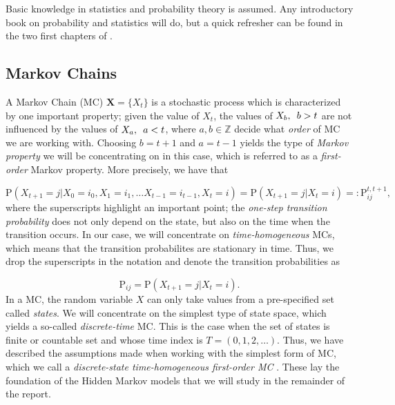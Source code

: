 \documentclass{article}\usepackage[]{graphicx}\usepackage[]{color}
\begin{document}
Basic knowledge in statistics and probability theory is assumed. Any introductory book on probability and statistics will do, but a quick refresher can be found in the two first chapters of \cite{Pinsky2011}.

\subsection{Markov Chains}
A Markov Chain (MC) $\mathbf{X} = \{X_t\}$ is a stochastic process which is characterized by one important property; given the value of $X_t$, the values of $X_b, \hspace{0.5em} b > t$ are not influenced by the values of $X_a, \hspace{0.5em} a < t$, where $a,b \in \mathbb{Z}$ decide what \textit{order} of MC we are working with. Choosing $b = t+1$ and $a = t-1$ yields the type of \textit{Markov property} we will be concentrating on in this case, which is referred to as a \textit{first-order} Markov property. More precisely, we have that 

\begin{equation*}
     \text{P}(X_{t+1} = j|X_0 = i_0, X_1 = i_1, \ldots X_{t-1} = i_{t-1}, X_t = i) = \text{P}(X_{t+1} = j|X_t = i) =: \text{P}_{ij}^{t, t+1}, 
\end{equation*}
where the superscripts highlight an important point; the \textit{one-step transition probability} does not only depend on the state, but also on the time when the transition occurs. In our case, we will concentrate on \textit{time-homogeneous} MCs, which means that the transition probabilites are stationary in time. Thus, we drop the superscripts in the notation and denote the transition probabilities as 

\begin{equation*}
    \text{P}_{ij} = \text{P}(X_{t+1} = j|X_t = i).
\end{equation*}
In a MC, the random variable $X$ can only take values from a pre-specified set called \textit{states}. We will concentrate on the simplest type of state space, which yields a so-called \textit{discrete-time} MC. This is the case when the set of states is finite or countable set and whose time index is $T = (0,1,2,\ldots)$. Thus, we have described the assumptions made when working with the simplest form of MC, which we call a \textit{discrete-state time-homogeneous first-order MC} \cite{Pinsky2011}. These lay the foundation of the Hidden Markov models that we will study in the remainder of the report. 
\end{document}
